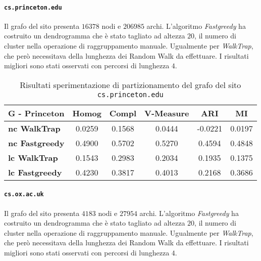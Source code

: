 \paragraph{\texttt{cs.princeton.edu}} Il grafo del sito presenta $16378$ nodi e $206985$ archi. L'algoritmo \textit{Fastgreedy} ha costruito un dendrogramma che è stato tagliato ad altezza $20$, il numero di cluster nella operazione di raggruppamento manuale. Ugualmente per \textit{WalkTrap}, che però necessitava della lunghezza dei Random Walk da effettuare. I risultati migliori sono stati osservati con percorsi di lunghezza $4$.

\begin{table}[H]
	\begin{tabular}{| l | c | c | c | c | c |}
	\hline
	\textbf{G - Princeton}  & \textbf{Homog} & \textbf{Compl} & \textbf{V-Measure}  & \textbf{ARI}  & \textbf{MI} \\ [3ex] \hline
	\textbf{nc WalkTrap} & 0.0259 & 0.1568 & 0.0444 & -0.0221 & 0.0197\\ [3ex]
	 \hline
	\textbf{nc Fastgreedy} & 0.4900 & 0.5702 & 0.5270 & 0.4594 & 0.4848\\ [3ex]
	 \hline	
	\textbf{lc WalkTrap} & 0.1543 & 0.2983 & 0.2034 & 0.1935 & 0.1375\\ [3ex]
	 \hline	
	\textbf{lc Fastgreedy} & 0.4230 & 0.3817 & 0.4013 & 0.2168 & 0.3686\\ [3ex]
	\hline
	\end{tabular}
	\caption{Risultati sperimentazione di partizionamento del grafo del sito \texttt{cs.princeton.edu}}
	\label{metricheGraphPrinc}
\end{table}

\paragraph{\texttt{cs.ox.ac.uk}} Il grafo del sito presenta $4183$ nodi e $27954$ archi. L'algoritmo \textit{Fastgreedy} ha costruito un dendrogramma che è stato tagliato ad altezza $20$, il numero di cluster nella operazione di raggruppamento manuale. Ugualmente per \textit{WalkTrap}, che però necessitava della lunghezza dei Random Walk da effettuare. I risultati migliori sono stati osservati con percorsi di lunghezza $4$.

